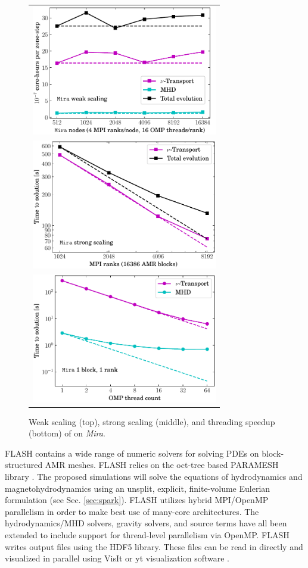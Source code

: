\begin{figure}
  \begin{tabular}{l}
    \includegraphics[width=3.2in]{figs/wkScaleSparkM1} \\
    \includegraphics[width=3.2in]{figs/strScaleSparkM1} \\
    \includegraphics[width=3.2in]{figs/thrdSpeedupSparkM1}
  \end{tabular}
  \caption{Weak scaling (top), strong scaling (middle), and threading
  speedup (bottom) of \sparkmone on {\it Mira}.}
  \label{fig:scaling}
\end{figure}
FLASH contains a wide range of numeric solvers for solving
PDEs on block-structured AMR meshes. FLASH relies on the oct-tree
based PARAMESH library \citep{MacNeice:2000}. The proposed
simulations will solve the equations of hydrodynamics and
magnetohydrodynamics using an unsplit, explicit, finite-volume
Eulerian formulation (see Sec. \ref{sec:spark}).
FLASH utilizes hybrid MPI/OpenMP parallelism in order to make best use
of many-core architectures. The hydrodynamics/MHD
solvers, gravity solvers, and source terms have all been extended to
include support for thread-level parallelism via OpenMP.
FLASH writes output files using the HDF5 library. These files can be
read in directly and visualized in parallel using VisIt or yt
visualization software \citep{Turk:2011}.



